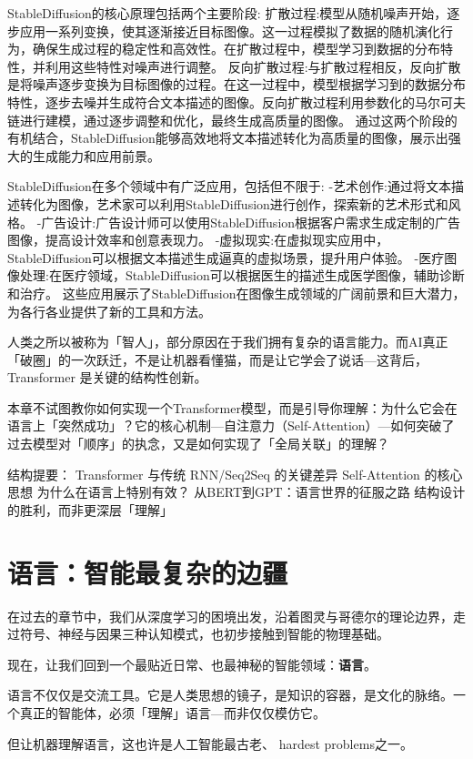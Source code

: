 StableDiffusion的核心原理包括两个主要阶段:
扩散过程:模型从随机噪声开始，逐步应用一系列变换，使其逐渐接近目标图像。这一过程模拟了数据的随机演化行为，确保生成过程的稳定性和高效性。在扩散过程中，模型学习到数据的分布特性，并利用这些特性对噪声进行调整。
反向扩散过程:与扩散过程相反，反向扩散是将噪声逐步变换为目标图像的过程。在这一过程中，模型根据学习到的数据分布特性，逐步去噪并生成符合文本描述的图像。反向扩散过程利用参数化的马尔可夫链进行建模，通过逐步调整和优化，最终生成高质量的图像。
通过这两个阶段的有机结合，StableDiffusion能够高效地将文本描述转化为高质量的图像，展示出强大的生成能力和应用前景。

StableDiffusion在多个领域中有广泛应用，包括但不限于:
-艺术创作:通过将文本描述转化为图像，艺术家可以利用StableDiffusion进行创作，探索新的艺术形式和风格。
-广告设计:广告设计师可以使用StableDiffusion根据客户需求生成定制的广告图像，提高设计效率和创意表现力。
-虚拟现实:在虚拟现实应用中，StableDiffusion可以根据文本描述生成逼真的虚拟场景，提升用户体验。
-医疗图像处理:在医疗领域，StableDiffusion可以根据医生的描述生成医学图像，辅助诊断和治疗。
这些应用展示了StableDiffusion在图像生成领域的广阔前景和巨大潜力，为各行各业提供了新的工具和方法。

人类之所以被称为「智人」，部分原因在于我们拥有复杂的语言能力。而AI真正「破圈」的一次跃迁，不是让机器看懂猫，而是让它学会了说话---这背后，Transformer 是关键的结构性创新。

本章不试图教你如何实现一个Transformer模型，而是引导你理解：为什么它会在语言上「突然成功」？它的核心机制---自注意力（Self-Attention）---如何突破了过去模型对「顺序」的执念，又是如何实现了「全局关联」的理解？

结构提要：
Transformer 与传统 RNN/Seq2Seq 的关键差异
Self-Attention 的核心思想
为什么在语言上特别有效？
从BERT到GPT：语言世界的征服之路
结构设计的胜利，而非更深层「理解」

\section*{语言：智能最复杂的边疆}

在过去的章节中，我们从深度学习的困境出发，沿着图灵与哥德尔的理论边界，走过符号、神经与因果三种认知模式，也初步接触到智能的物理基础。

现在，让我们回到一个最贴近日常、也最神秘的智能领域：\textbf{语言}。

语言不仅仅是交流工具。它是人类思想的镜子，是知识的容器，是文化的脉络。一个真正的智能体，必须「理解」语言---而非仅仅模仿它。

但让机器理解语言，这也许是人工智能最古老、 hardest problems之一。

